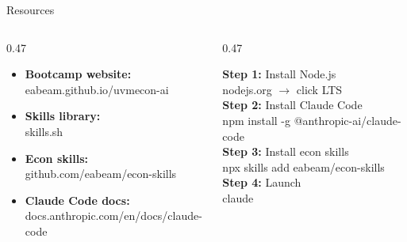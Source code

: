 \documentclass[aspectratio=169, 10pt]{beamer}
\begin{document}
\begin{frame}{Resources}
\begin{columns}[T]
\begin{column}{0.47\textwidth}
\begin{tcolorbox}[keybox, title={\faLink\quad Links}]
\small
\begin{itemize}\setlength{\itemsep}{4pt}
  \item \textbf{Bootcamp website:}\\{\scriptsize\ttfamily eabeam.github.io/uvmecon-ai}
  \item \textbf{Skills library:}\\{\scriptsize\ttfamily skills.sh}
  \item \textbf{Econ skills:}\\{\scriptsize\ttfamily github.com/eabeam/econ-skills}
  \item \textbf{Claude Code docs:}\\{\scriptsize\ttfamily docs.anthropic.com/en/docs/claude-code}
\end{itemize}
\end{tcolorbox}
\end{column}
\begin{column}{0.47\textwidth}
\begin{tcolorbox}[keybox, title={\faTerminal\quad Install Commands}]
\small
\textbf{Step 1:} Install Node.js\\
{\scriptsize\ttfamily nodejs.org} $\rightarrow$ click LTS\\[4pt]
\textbf{Step 2:} Install Claude Code\\
{\scriptsize\ttfamily npm install -g @anthropic-ai/claude-code}\\[4pt]
\textbf{Step 3:} Install econ skills\\
{\scriptsize\ttfamily npx skills add eabeam/econ-skills}\\[4pt]
\textbf{Step 4:} Launch\\
{\scriptsize\ttfamily claude}
\end{tcolorbox}
\end{column}
\end{columns}
\end{frame}
\end{document}
